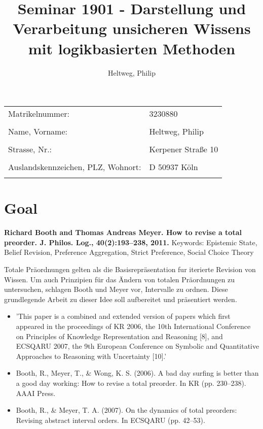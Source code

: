 \documentclass[11pt]{article}
\begin{document}
\title{Seminar 1901 - Darstellung und Verarbeitung unsicheren Wissens mit logikbasierten Methoden}
\author{
	Heltweg, Philip
}
\maketitle

\begin{tabular}{l l}
Matrikelnummer: & 3230880\\
\\
Name, Vorname: & Heltweg, Philip\\
\\
Strasse, Nr.: & Kerpener Straße 10\\
\\
Auslandskennzeichen, PLZ, Wohnort: & D 50937 Köln\\
\\
\end{tabular}

\newpage

\section{Goal}
\textbf{Richard Booth and Thomas Andreas Meyer. How to revise a total preorder. J. Philos. Log., 40(2):193–238, 2011.}
Keywords: Epistemic State, Belief Revision, Preference Aggregation, Strict Preference, Social Choice Theory

Totale Präordnungen gelten als die Basisrepräsentation fur iterierte Revision von Wissen. Um auch Prinzipien für das Ändern von totalen Präordnungen zu untersuchen, schlagen Booth und Meyer vor, Intervalle zu ordnen. Diese grundlegende Arbeit zu dieser Idee soll aufbereitet und präsentiert werden.

\begin{itemize}
    \item 'This paper is a combined and extended version of papers which first appeared in the proceedings of KR 2006, the 10th International Conference on Principles of Knowledge Representation and Reasoning [8], and ECSQARU 2007, the 9th European Conference on Symbolic and Quantitative Approaches to Reasoning with Uncertainty [10].'
    \item Booth, R., Meyer, T., \& Wong, K. S. (2006). A bad day surfing is better than a good day working: How to revise a total preorder. In KR (pp. 230–238). AAAI Press.
    \item Booth, R., \& Meyer, T. A. (2007). On the dynamics of total preorders: Revising abstract interval orders. In ECSQARU (pp. 42–53).
\end{itemize}
\end{document}

